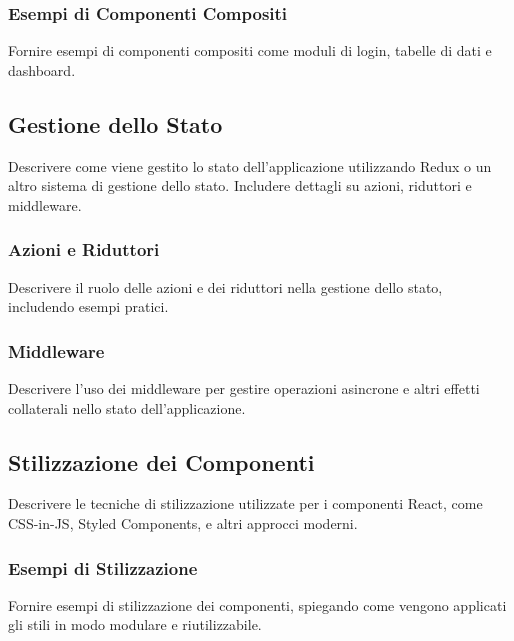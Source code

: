 \subsubsection*{Esempi di Componenti Compositi}
Fornire esempi di componenti compositi come moduli di login, tabelle di dati e dashboard.

\subsection{Gestione dello Stato}
Descrivere come viene gestito lo stato dell'applicazione utilizzando Redux o un altro sistema di gestione dello stato. Includere dettagli su azioni, riduttori e middleware.

\subsubsection*{Azioni e Riduttori}
Descrivere il ruolo delle azioni e dei riduttori nella gestione dello stato, includendo esempi pratici.

\subsubsection*{Middleware}
Descrivere l'uso dei middleware per gestire operazioni asincrone e altri effetti collaterali nello stato dell'applicazione.

\subsection{Stilizzazione dei Componenti}
Descrivere le tecniche di stilizzazione utilizzate per i componenti React, come CSS-in-JS, Styled Components, e altri approcci moderni.

\subsubsection*{Esempi di Stilizzazione}
Fornire esempi di stilizzazione dei componenti, spiegando come vengono applicati gli stili in modo modulare e riutilizzabile.

\newpage